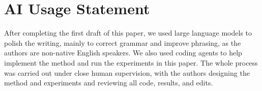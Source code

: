 \section*{AI Usage Statement}

After completing the first draft of this paper, we used large language models to polish the writing, mainly to correct grammar and improve phrasing, as the authors are non-native English speakers.
We also used coding agents to help implement the method and run the experiments in this paper.
The whole process was carried out under close human supervision, with the authors designing the method and experiments and reviewing all code, results, and edits.
